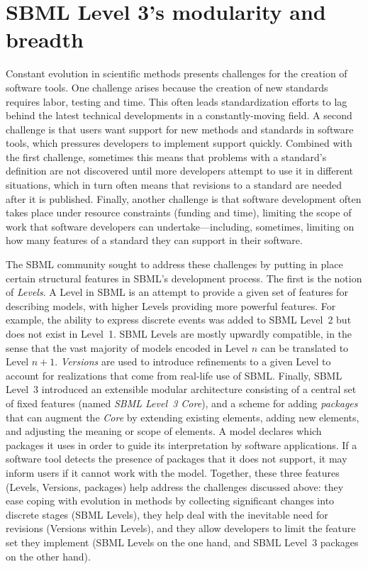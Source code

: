 \documentclass{sbml-paper}
\begin{document}
\section*{SBML Level 3's modularity and breadth}\label{sec:modularity}

Constant evolution in scientific methods presents challenges for the creation of software tools.  One challenge arises because the creation of new standards requires labor, testing and time.  This often leads standardization efforts to lag behind the latest technical developments in a constantly-moving field.  A second challenge is that users want support for new methods and standards in software tools, which pressures developers to implement support quickly.  Combined with the first challenge, sometimes this means that problems with a standard's definition are not discovered until more developers attempt to use it in different situations, which in turn often means that revisions to a standard are needed after it is published.  Finally, another challenge is that software development often takes place under resource constraints (\eg funding and time), limiting the scope of work that software developers can undertake---including, sometimes, limiting on how many features of a standard they can support in their software.

The SBML community sought to address these challenges by putting in place certain structural features in SBML's development process.  The first is the notion of \emph{Levels}.  A Level in SBML is an attempt to provide a given set of features for describing models, with higher Levels providing more powerful features.  For example, the ability to express discrete events was added to SBML Level~2 but does not exist in Level~1.  SBML Levels are mostly upwardly compatible, in the sense that the vast majority of models encoded in Level $n$ can be translated to Level $n+1$.  \emph{Versions} are used to introduce refinements to a given Level to account for realizations that come from real-life use of SBML.  Finally, SBML Level~3 introduced an extensible modular architecture consisting of a central set of fixed features (named \emph{SBML Level~3 Core}), and a scheme for adding \emph{packages} that can augment the \emph{Core} by extending existing elements, adding new elements, and adjusting the meaning or scope of elements.  A model declares which packages it uses in order to guide its interpretation by software applications.  If a software tool detects the presence of packages that it does not support, it may inform users if it cannot work with the model.  Together, these three features (Levels, Versions, packages) help address the challenges discussed above: they ease coping with evolution in methods by collecting significant changes into discrete stages (SBML Levels), they help deal with the inevitable need for revisions (Versions within Levels), and they allow developers to limit the feature set they implement (SBML Levels on the one hand, and SBML Level~3 packages on the other hand).
\end{document}
